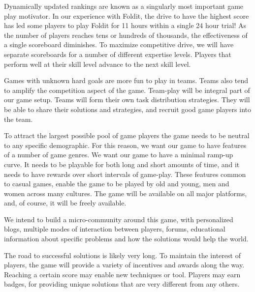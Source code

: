 \documentclass{sig-alternate}
\let\Description =\description
\def\Nospacing{\itemsep=0pt\topsep=0pt\partopsep=0pt\parskip=0pt\parsep=0pt}
\renewenvironment{description}{\Description\Nospacing}{\endlist}
\begin{document}
\begin{description}
\item[Competition.] Dynamically updated rankings are known as a
  singularly most important game play motivator. In our experience
  with Foldit, the drive to have the highest score has led some
  players to play Foldit for 11 hours within a single 24 hour trial!
  As the number of players reaches tens or hundreds of thousands, the
  effectiveness of a single scoreboard diminishes. To maximize
  competitive drive, we will have separate scoreboards for a number of
  different expertise levels. Players that perform well at their skill
  level advance to the next skill level.

\item[Collaboration.] Games with unknown hard goals are more fun to
  play in teams. Teams also tend to amplify the competition aspect of
  the game. Team-play will be integral part of our game setup. Teams
  will form their own task distribution strategies. They will be able
  to share their solutions and strategies, and recruit good game
  players into the team.

\item[Demographic neutrality.] To attract the largest possible pool of
  game players the game needs to be neutral to any specific
  demographic. For this reason, we want our game to have features of a
  number of game genres. We want our game to have a minimal ramp-up
  curve. It needs to be playable for both long and short amounts of
  time, and it needs to have rewards over short intervals of
  game-play. These features common to casual games, enable the game to
  be played by old and young, men and women across many cultures. The
  game will be available on all major platforms, and, of course, it
  will be freely available.

\item[Game Community.] We intend to build a micro-community around
  this game, with personalized blogs, multiple modes of interaction
  between players, forums, educational information about specific
  problems and how the solutions would help the world.

\item[Encouragement Awards.] The road to successful solutions is
  likely very long. To maintain the interest of players, the game will
  provide a variety of incentives and awards along the way. Reaching a
  certain score may enable new techniques or tool. Players may earn
  badges, for providing unique solutions that are very different from
  any others.


\end{description}
\end{document}
